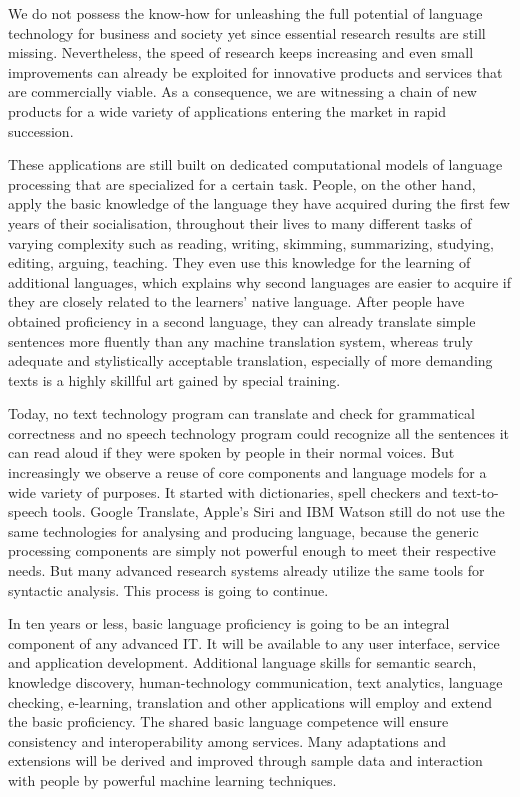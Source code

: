 \documentclass[10pt, plain]{../../metanetpaper}
\begin{document}
\begin{multicols}{2}
We do not possess the know-how for unleashing the full potential of language technology for business and society yet since essential research results are still missing. Nevertheless, the speed of research keeps increasing and even small improvements can already be exploited for innovative products and services that are commercially viable. As a consequence, we are witnessing a chain of new products for a wide variety of applications entering the market in rapid succession.

These applications are still built on dedicated computational models of language processing that are specialized for a certain task. People, on the other hand, apply the basic knowledge of the language they have acquired during the first few years of their socialisation, throughout their lives to many different tasks of varying complexity such as reading, writing, skimming, summarizing, studying, editing, arguing, teaching. They even use this knowledge for the learning of additional languages, which explains why second languages are easier to acquire if they are closely related to the learners' native language. After people have obtained proficiency in a second language, they can already translate simple sentences more fluently than any machine translation system, whereas truly adequate and stylistically acceptable translation, especially of more demanding texts is a highly skillful art gained by special training.

Today, no text technology program can translate and check for grammatical correctness and no speech technology program could recognize all the sentences it can read aloud if they were spoken by people in their normal voices. But increasingly we observe a reuse of core components and language models for a wide variety of purposes. It started with dictionaries, spell checkers and text-to-speech tools. Google Translate, Apple's Siri and IBM Watson still do not use the same technologies for analysing and producing language, because the generic processing components are simply not powerful enough to meet their respective needs. But many advanced research systems already utilize the same tools for syntactic analysis. This process is going to continue.

In ten years or less, basic language proficiency is going to be an integral component of any advanced IT. It will be available to any user interface, service and application development. Additional language skills for semantic search, knowledge discovery, human-technology communication, text analytics, language checking, e-learning, translation and other applications will employ and extend the basic proficiency. The shared basic language competence will ensure consistency and interoperability among services. Many adaptations and extensions will be derived and improved through sample data and interaction with people by powerful machine learning techniques.


\end{multicols}
\end{document}
